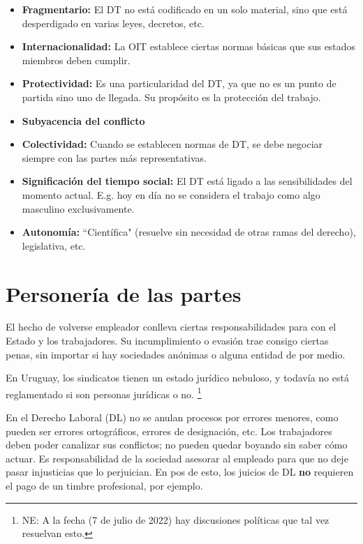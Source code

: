 \documentclass[../main.tex]{subfiles}
\begin{document}
\begin{itemize}
	\item \textbf{Fragmentario:} El DT no está codificado en un solo material, sino que está desperdigado en varias leyes, decretos, etc.

	\item \textbf{Internacionalidad:} La OIT establece ciertas normas básicas que sus estados miembros deben cumplir.

	\item \textbf{Protectividad:} Es una particularidad del DT, ya que no es un punto de partida sino uno de llegada. Su propósito es la protección del trabajo.

	\item \textbf{Subyacencia del conflicto}

	\item \textbf{Colectividad:} Cuando se establecen normas de DT, se debe negociar siempre con las partes más representativas.

	\item \textbf{Significación del tiempo social:} El DT está ligado a las sensibilidades del momento actual. E.g. hoy en día no se considera el trabajo como algo masculino exclusivamente.

	\item \textbf{Autonomía:} ``Científica" (resuelve sin necesidad de otras ramas del derecho), legislativa, etc.
\end{itemize}

\section{Personería de las partes}

El hecho de volverse empleador conlleva ciertas responsabilidades para con el Estado y los trabajadores.
Su incumplimiento o evasión trae consigo ciertas penas, sin importar si hay sociedades anónimas o alguna entidad de por medio.

En Uruguay, los sindicatos tienen un estado jurídico nebuloso, y todavía no está reglamentado si son personas jurídicas o no.
\footnote{NE: A la fecha (7 de julio de 2022) hay discusiones políticas que tal vez resuelvan esto.}

En el Derecho Laboral (DL) no se anulan procesos por errores menores, como pueden ser errores ortográficos, errores de designación, etc.
Los trabajadores deben poder canalizar sus conflictos; no pueden quedar boyando sin saber cómo actuar.
Es responsabilidad de la sociedad asesorar al empleado para que no deje pasar injusticias que lo perjuician.
En pos de esto, los juicios de DL \textbf{no} requieren el pago de un timbre profesional, por ejemplo.
\end{document}
